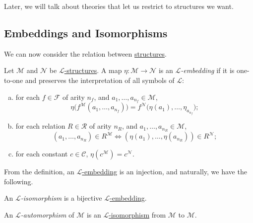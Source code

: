 \begin{note}
	Later, we will talk about theories that let us restrict to structures we want.
\end{note}

\subsection{Embeddings and Isomorphisms}
We can now consider the relation between \hyperref[def:structure]{structures}.

\begin{definition}[Embedding]\label{def:embedding}
	Let \(\mathcal{M} \) and \(\mathcal{N} \) be \hyperref[def:structure]{\(\mathcal{L} \)-structures}. A map \(\eta \colon \mathcal{M} \to \mathcal{N}\) is an \emph{\(\mathcal{L} \)-embedding} if it is one-to-one and preserves the interpretation of all symbols of \(\mathcal{L} \):
	\begin{enumerate}[(a)]
		\item for each \(f\in \mathcal{F} \) of arity \(n_f\), and \(a_1, \ldots , a_{n_f}\in \mathcal{M} \),
		      \[
			      \eta \big(f^{\mathcal{M} }(a_1, \ldots , a_{n_f})\big) = f^{\mathcal{N}} \big( \eta (a_1), \ldots , \eta _{a_{n_f}}\big);
		      \]
		\item for each relation \(R\in \mathcal{R} \) of arity \(n_R\), and \(a_1, \ldots , a_{n_R}\in \mathcal{M} \),
		      \[
			      (a_1, \ldots , a_{n_R})\in R^{\mathcal{M} } \iff (\eta (a_1), \ldots , \eta (a_{n_R})) \in R^{\mathcal{N} };
		      \]
		\item for each constant \(c\in \mathcal{C} \), \(\eta (c^{\mathcal{M} } ) = c^{\mathcal{N} }\).
	\end{enumerate}
\end{definition}

From the definition, an \hyperref[def:embedding]{\(\mathcal{L} \)-embedding} is an injection, and naturally, we have the following.

\begin{definition}[Isomorphism]\label{def:isomorphism}
	An \emph{\(\mathcal{L} \)-isomorphism} is a bijective \hyperref[def:embedding]{\(\mathcal{L} \)-embedding}.
\end{definition}

\begin{definition}[Automorphism]\label{def:automorphism}
	An \emph{\(\mathcal{L} \)-automorphism} of \(\mathcal{M} \) is an \hyperref[def:isomorphism]{\(\mathcal{L} \)-isomorphism} from \(\mathcal{M} \) to \(\mathcal{M} \).
\end{definition}

